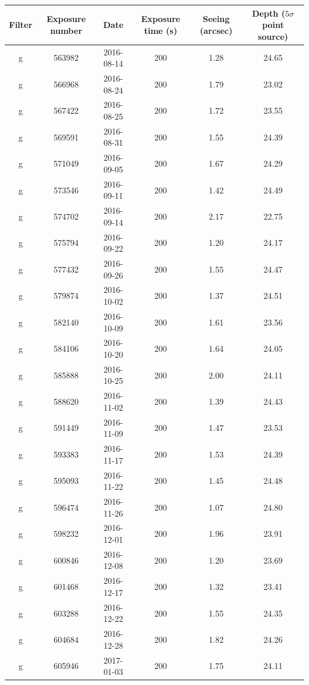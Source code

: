 \documentclass[letterpaper,preprint]{aastex62}
\begin{document}
\begin{table}
  \begin{center}
    \begin{scriptsize}
    \begin{tabular}{cccccc}
      \hline
      Filter & Exposure number & Date & Exposure time (s) &
      Seeing (arcsec) & Depth ($5 \sigma$ point source) \\
      \hline
      g & 563982 & 2016-08-14 & 200 & 1.28 & 24.65 \\
      g & 566968 & 2016-08-24 & 200 & 1.79 & 23.02 \\
      g & 567422 & 2016-08-25 & 200 & 1.72 & 23.55 \\
      g & 569591 & 2016-08-31 & 200 & 1.55 & 24.39 \\
      g & 571049 & 2016-09-05 & 200 & 1.67 & 24.29 \\
      g & 573546 & 2016-09-11 & 200 & 1.42 & 24.49 \\
      g & 574702 & 2016-09-14 & 200 & 2.17 & 22.75 \\
      g & 575794 & 2016-09-22 & 200 & 1.20 & 24.17 \\
      g & 577432 & 2016-09-26 & 200 & 1.55 & 24.47 \\
      g & 579874 & 2016-10-02 & 200 & 1.37 & 24.51 \\
      g & 582140 & 2016-10-09 & 200 & 1.61 & 23.56 \\
      g & 584106 & 2016-10-20 & 200 & 1.64 & 24.05 \\
      g & 585888 & 2016-10-25 & 200 & 2.00 & 24.11 \\
      g & 588620 & 2016-11-02 & 200 & 1.39 & 24.43 \\
      g & 591449 & 2016-11-09 & 200 & 1.47 & 23.53 \\
      g & 593383 & 2016-11-17 & 200 & 1.53 & 24.39 \\
      g & 595093 & 2016-11-22 & 200 & 1.45 & 24.48 \\
      g & 596474 & 2016-11-26 & 200 & 1.07 & 24.80 \\
      g & 598232 & 2016-12-01 & 200 & 1.96 & 23.91 \\
      g & 600846 & 2016-12-08 & 200 & 1.20 & 23.69 \\
      g & 601468 & 2016-12-17 & 200 & 1.32 & 23.41 \\
      g & 603288 & 2016-12-22 & 200 & 1.55 & 24.35 \\
      g & 604684 & 2016-12-28 & 200 & 1.82 & 24.26 \\
      g & 605946 & 2017-01-03 & 200 & 1.75 & 24.11 \\

\end{tabular}
\end{scriptsize}
\end{center}
\end{table}
\end{document}
